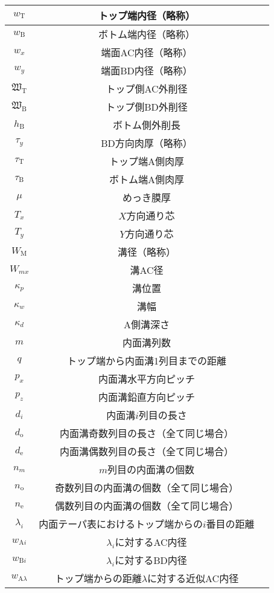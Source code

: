 \begin{longtable}{|c|Sl|}
$w_\mathrm T$ & トップ端内径（略称）\\\hline
$w_\mathrm B$ & ボトム端内径（略称）\\\hline
$w_x$ & 端面AC内径（略称）\\\hline
$w_y$ & 端面BD内径（略称）\\\hline
$\mathfrak W_\mathrm T$ & トップ側AC外削径\\\hline
$\mathfrak W_\mathrm B$ & トップ側BD外削径\\\hline
$h_\mathrm B$ & ボトム側外削長\\\hline
$\tau_y$ & BD方向肉厚（略称）\\\hline
$\tau_\mathrm T$ & トップ端A側肉厚\\\hline
$\tau_\mathrm B$ & ボトム端A側肉厚\\\hline
$\mu$ & めっき膜厚\\\hline
$T_x$ & $X$方向通り芯\\\hline
$T_y$ & $Y$方向通り芯\\\hline
$W_\mathrm M$ & 溝径（略称）\\\hline
$W_{mx}$ & 溝AC径\\\hline
$\kappa_p$ & 溝位置\\\hline
$\kappa_w$ & 溝幅\\\hline
$\kappa_d$ & A側溝深さ\\\hline
$m$ & 内面溝列数\\\hline
$q$ & トップ端から内面溝1列目までの距離\\\hline
$p_x$ & 内面溝水平方向ピッチ\\\hline
$p_z$ & 内面溝鉛直方向ピッチ\\\hline
$d_i$ & 内面溝$i$列目の長さ\\\hline
$d_\mathrm o$ & 内面溝奇数列目の長さ（全て同じ場合）\\\hline
$d_\mathrm e$ & 内面溝偶数列目の長さ（全て同じ場合）\\\hline
$n_m$ & $m$列目の内面溝の個数\\\hline
$n_\mathrm o$ & 奇数列目の内面溝の個数（全て同じ場合）\\\hline
$n_\mathrm e$ & 偶数列目の内面溝の個数（全て同じ場合）\\\hline
$\lambda_i$ & 内面テーパ表におけるトップ端からの$i$番目の距離\\\hline
$w_{\mathrm Ai}$ & $\lambda_i$に対するAC内径\\\hline
$w_{\mathrm Bi}$ & $\lambda_i$に対するBD内径\\\hline
$w_{\mathrm A\lambda}$ & トップ端からの距離$\lambda$に対する近似AC内径\\\hline

\end{longtable}
